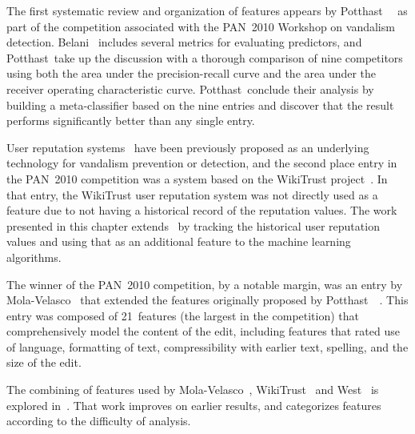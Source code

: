 The first systematic review and organization of features appears
by Potthast~\etal~\cite{Potthast2010b} as part of the competition
associated with the PAN~2010 Workshop on vandalism
detection.
Belani~\cite{Belani2010} includes several metrics for evaluating
predictors, and Potthast~\etal take up the discussion with a thorough
comparison of nine competitors using both the area under the
precision-recall curve and the area under the receiver operating
characteristic curve.
Potthast~\etal conclude their analysis by building a meta-classifier
based on the nine entries and discover that the result performs
significantly better than any single entry.

User reputation systems~\cite{Zeng2006,WikiMTWtrust06,Adler2007}
have been previously proposed as an underlying technology for
vandalism prevention or detection, and the second place entry in
the PAN~2010 competition was a system based on the
WikiTrust project~\cite{Adler2010b}.
In that entry, the WikiTrust user reputation system was not
directly used as a feature due to not having a historical record
of the reputation values.
The work presented in this chapter extends~\cite{Adler2010b} by
tracking the historical user reputation values and using that
as an additional feature to the machine learning algorithms.

The winner of the PAN~2010 competition, by a notable margin, was
an entry by Mola-Velasco~\cite{Mola2010} that extended the features
originally proposed by Potthast~\etal~\cite{Potthast2008}.
This entry was composed of 21~features (the largest in the
competition) that comprehensively model the content of the edit,
including features that rated use of language, formatting of text,
compressibility with earlier text, spelling,
and the size of the edit.

The combining of features used by Mola-Velasco~\cite{Mola2010},
WikiTrust~\cite{Adler2010b} and West~\cite{West2010}
is explored in~\cite{Adler2011}.
That work improves on earlier results, and categorizes features
according to the difficulty of analysis.


